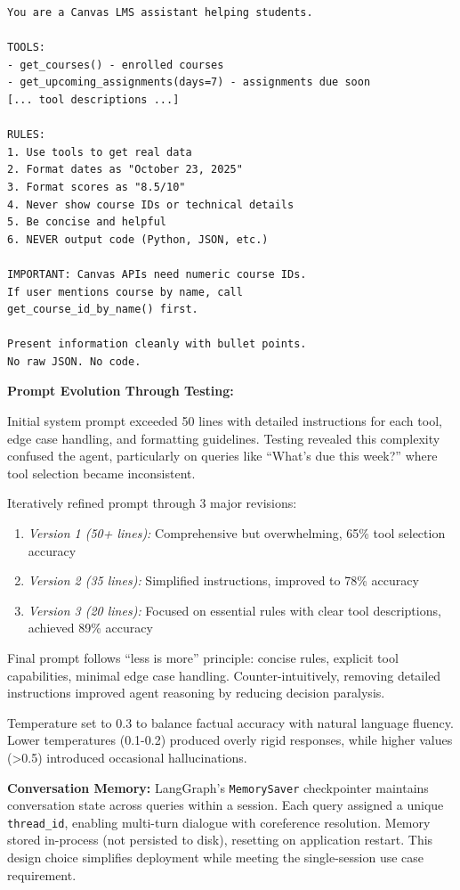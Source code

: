 \documentclass{article}
\begin{document}
\begin{verbatim}
You are a Canvas LMS assistant helping students.

TOOLS:
- get_courses() - enrolled courses
- get_upcoming_assignments(days=7) - assignments due soon
[... tool descriptions ...]

RULES:
1. Use tools to get real data
2. Format dates as "October 23, 2025"
3. Format scores as "8.5/10"
4. Never show course IDs or technical details
5. Be concise and helpful
6. NEVER output code (Python, JSON, etc.)

IMPORTANT: Canvas APIs need numeric course IDs.
If user mentions course by name, call 
get_course_id_by_name() first.

Present information cleanly with bullet points.
No raw JSON. No code.
\end{verbatim}

\textbf{Prompt Evolution Through Testing:}

Initial system prompt exceeded 50 lines with detailed instructions for each tool, edge case handling, and formatting guidelines. Testing revealed this complexity confused the agent, particularly on queries like ``What's due this week?'' where tool selection became inconsistent.

Iteratively refined prompt through 3 major revisions:
\begin{enumerate}
    \item \textit{Version 1 (50+ lines):} Comprehensive but overwhelming, 65\% tool selection accuracy
    \item \textit{Version 2 (35 lines):} Simplified instructions, improved to 78\% accuracy
    \item \textit{Version 3 (20 lines):} Focused on essential rules with clear tool descriptions, achieved 89\% accuracy
\end{enumerate}

Final prompt follows ``less is more'' principle: concise rules, explicit tool capabilities, minimal edge case handling. Counter-intuitively, removing detailed instructions improved agent reasoning by reducing decision paralysis.


Temperature set to 0.3 to balance factual accuracy with natural language fluency. Lower temperatures (0.1-0.2) produced overly rigid responses, while higher values (>0.5) introduced occasional hallucinations.

\textbf{Conversation Memory:} LangGraph's \texttt{MemorySaver} checkpointer maintains conversation state across queries within a session. Each query assigned a unique \texttt{thread\_id}, enabling multi-turn dialogue with coreference resolution. Memory stored in-process (not persisted to disk), resetting on application restart. This design choice simplifies deployment while meeting the single-session use case requirement.
\end{document}
